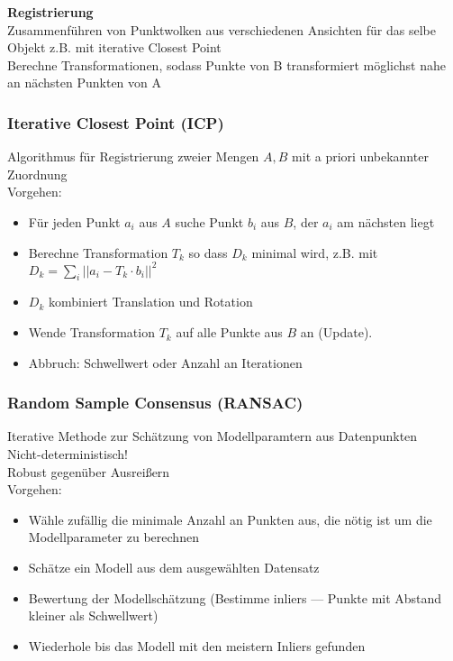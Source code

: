 \textbf{Registrierung}\\
Zusammenführen von Punktwolken aus verschiedenen Ansichten für das selbe Objekt
z.B. mit iterative Closest Point\\
Berechne Transformationen, sodass Punkte von B transformiert möglichst nahe an nächsten Punkten von A

\subsubsection{Iterative Closest Point (ICP)}%
\label{bv:ssub:iterative-closest-point}
Algorithmus für Registrierung zweier Mengen \(A,B\) mit a priori unbekannter Zuordnung\\
Vorgehen:
\begin{itemize}
\item Für jeden Punkt \(a_i\) aus \(A\) suche Punkt \(b_i\) aus \(B\), der \(a_i\) am nächsten liegt
\item Berechne Transformation \(T_k\) so dass \(D_k\) minimal wird, z.B. mit
  \(D_k = \sum_i || a_i - T_k \cdot b_i ||^2\)
\item \(D_k\) kombiniert Translation und Rotation
\item Wende Transformation \(T_k\) auf alle Punkte aus \(B\) an (Update).
\item Abbruch: Schwellwert oder Anzahl an Iterationen
\end{itemize}

\subsubsection{Random Sample Consensus (RANSAC)}%
\label{bv:ssub:random-sample-consensus}
Iterative Methode zur Schätzung von Modellparamtern aus Datenpunkten\\
Nicht-deterministisch!\\
Robust gegenüber Ausreißern\\
Vorgehen:
\begin{itemize}
\item Wähle zufällig die minimale Anzahl an Punkten aus, die nötig ist um die Modellparameter zu berechnen
\item Schätze ein Modell aus dem ausgewählten Datensatz
\item Bewertung der Modellschätzung (Bestimme inliers --- Punkte mit Abstand kleiner als Schwellwert)
\item Wiederhole bis das Modell mit den meistern Inliers gefunden
\end{itemize}


